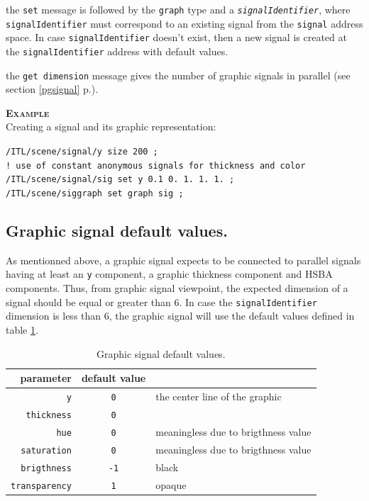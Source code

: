 \documentclass[a4paper,twoside]{report}
\newcommand{\subsublevel}[1]	{\subsection{#1}}
\newcommand{\fullref}[1]	{\ref{#1} p.\pageref{#1}}
\newcommand{\OSC}[1]		{\texttt{#1}}
\newcommand{\values}[1]		{\texttt{#1}}
\newcommand{\example}		{\textbf{\hspace{-1.5cm}\textbf{\textsc{Example }}}}
\let\olditemize\itemize
\let\oldenditemize\enditemize
\renewenvironment{itemize} 	{\olditemize \setlength{\itemsep}{1mm}}{\oldenditemize}
\newcommand{\sample}	[1]			{\vspace{-2mm}\begin{center}\colorbox{mygrey}{
								\begin{minipage}[t]{0.9\columnwidth} 
								{\small \texttt{#1}}
								\end{minipage}}\end{center}}
\begin{document}
\begin{itemize}
\item the \OSC{set} message is followed by the \OSC{graph} type and a \OSC{\textit{signalIdentifier}}, where \OSC{signalIdentifier} must correspond to an existing signal from the \OSC{signal} address space. In case \OSC{signalIdentifier} doesn't exist, then a new signal is created at the \OSC{signalIdentifier} address with default values. 
\item the \OSC{get dimension} message gives the number of graphic signals in parallel (see section \fullref{pgsignal}). 
 \end{itemize}
 
\example \\
Creating a signal and its graphic representation:
\sample{/ITL/scene/signal/y size 200 ; \\
! use of constant anonymous signals for thickness and color\\
/ITL/scene/signal/sig set y 0.1 0. 1. 1. 1. ; \\
/ITL/scene/siggraph set graph sig ;
}

\subsublevel{Graphic signal default values.}
As mentionned above, a graphic signal expects to be connected to parallel signals having at least an \values{y} component, a graphic thickness component and HSBA components. Thus, from graphic signal viewpoint, the expected dimension of a signal should be equal or greater than 6. In case the \OSC{signalIdentifier} dimension is less than 6, the graphic signal will use the default values defined in table \ref{gsigdefault}.

\begin{table}[htdp]
\caption{Graphic signal default values.}
\begin{center}
\begin{tabular}{|r|cl|}
\hline
parameter & default value & \\
\hline
\OSC{y}					& \OSC{0} & the center line of the graphic \\
\OSC{thickness}		& \OSC{0} & \\
\OSC{hue}				& \OSC{0} & meaningless due to brigthness value \\
\OSC{saturation}		& \OSC{0} & meaningless due to brigthness value \\
\OSC{brigthness}		& \OSC{-1} & black \\
\OSC{transparency}		& \OSC{1} & opaque \\
\hline
\end{tabular}
\end{center}
\label{gsigdefault}
\end{table}
\end{document}
